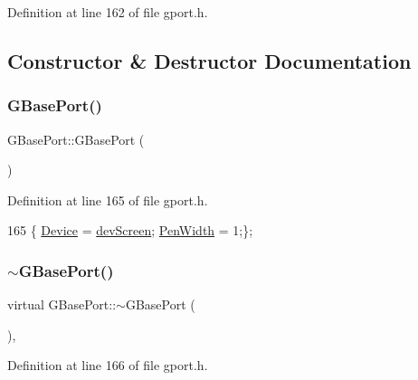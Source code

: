 Definition at line 162 of file gport.\+h.



\subsection{Constructor \& Destructor Documentation}
\mbox{\label{class_g_base_port_a3bd74a4fc4533f7033dd6697896f764c}} 
\subsubsection{\texorpdfstring{G\+Base\+Port()}{GBasePort()}}
{\footnotesize\ttfamily G\+Base\+Port\+::\+G\+Base\+Port (\begin{DoxyParamCaption}{ }\end{DoxyParamCaption})\hspace{0.3cm}{\ttfamily [inline]}}



Definition at line 165 of file gport.\+h.


\begin{DoxyCode}
165 \{ \mbox{\hyperlink{class_g_base_port_a14275a027c8665d5fa4941e148a1b46a}{Device}} = \mbox{\hyperlink{gport_8h_a595e501a3b83fde14c760260fbfb153fad37755da7807453aee0eac7ef1d26483}{devScreen}}; \mbox{\hyperlink{class_g_base_port_a9a76c3a8af8d0e9f29035d02d8f038c1}{PenWidth}} = 1;\};
\end{DoxyCode}
\mbox{\label{class_g_base_port_ae8161e4d35bfa6bde771a77cbbde4183}} 
\subsubsection{\texorpdfstring{$\sim$\+G\+Base\+Port()}{~GBasePort()}}
{\footnotesize\ttfamily virtual G\+Base\+Port\+::$\sim$\+G\+Base\+Port (\begin{DoxyParamCaption}{ }\end{DoxyParamCaption})\hspace{0.3cm}{\ttfamily [inline]}, {\ttfamily [virtual]}}



Definition at line 166 of file gport.\+h.


